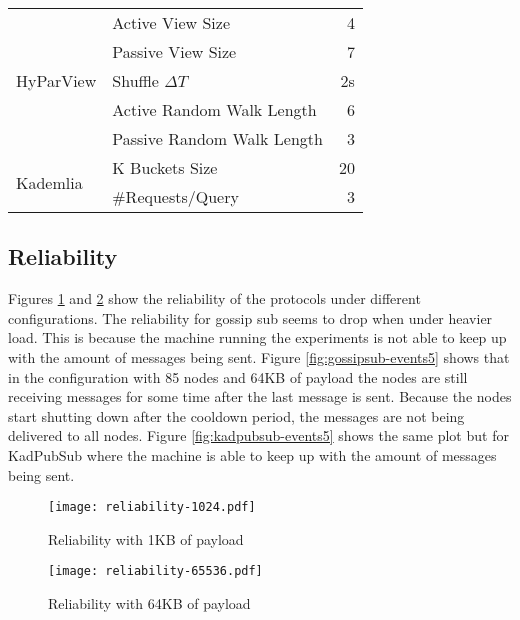 \documentclass[sigconf]{acmart}
\begin{document}
\begin{table}[]
{\begin{tabular}{|l|l|r|}
    \multirow{5}{*}{HyParView} & Active View Size           & 4                 \\
                               & Passive View Size          & 7                 \\
                               & Shuffle $\Delta T$         & 2s                \\
                               & Active Random Walk Length  & 6                 \\
                               & Passive Random Walk Length & 3                 \\ \hline
    \multirow{2}{*}{Kademlia}  & K Buckets Size             & 20                \\
                               & \#Requests/Query           & 3                 \\ \hline
    \end{tabular}%
    }
    \end{table}

\subsection{Reliability}
Figures \ref{fig:reliability-1024} and \ref{fig:reliability-65536} show the reliability of the protocols under different configurations.
The reliability for gossip sub seems to drop when under heavier load. This is because the machine running the experiments is not able to keep up with the amount of messages being sent. Figure \ref{fig:gossipsub-events5} shows that in the configuration with 85 nodes and 64KB of payload the nodes are still receiving messages for some time after the last message is sent. Because the nodes start shutting down after the cooldown period, the messages are not being delivered to all nodes. Figure \ref{fig:kadpubsub-events5} shows the same plot but for KadPubSub where the machine is able to keep up with the amount of messages being sent.

\begin{figure}[htp]
    \centering
    \texttt{[image: reliability-1024.pdf]}
    \caption{Reliability with 1KB of payload}
    \label{fig:reliability-1024}
\end{figure}

\begin{figure}[htp]
    \centering
    \texttt{[image: reliability-65536.pdf]}
    \caption{Reliability with 64KB of payload}
    \label{fig:reliability-65536}
\end{figure}
\end{document}
